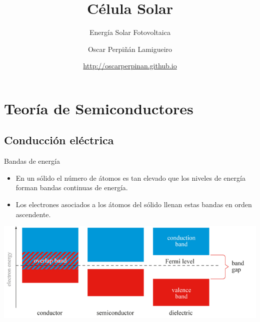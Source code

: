 \documentclass[xcolor={usenames,svgnames,dvipsnames}]{beamer}
\author{Oscar Perpiñán Lamigueiro}
\date{\url{http://oscarperpinan.github.io}}
\title{Célula Solar}
\subtitle{Energía Solar Fotovoltaica}
\begin{document}
\maketitle

\section{Teoría de Semiconductores}
\label{sec:orgc477b44}
\subsection{Conducción eléctrica}
\label{sec:orged59d0a}

\begin{frame}[label={sec:orgafffe50}]{Bandas de energía}
\begin{itemize}
\item En un \alert{sólido} el número de átomos es tan elevado que los niveles de energía forman \alert{bandas continuas de energía}.
\item Los \alert{electrones} asociados a los átomos del sólido \alert{llenan estas bandas en orden ascendente}.
\end{itemize}
\begin{center}


\begin{center}
\includegraphics[width=.9\linewidth]{../figs/simplified_band_diagram.jpg}
\end{center}
\end{center}
\end{frame}
\end{document}
